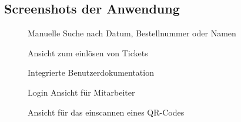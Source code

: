 \subsection{Screenshots der Anwendung}
\label{Screenshots}
\centering
{}
\clearpage
\begin{figure}[htb]
\centering
{}
\caption{Manuelle Suche nach Datum, Bestellnummer oder Namen}
\end{figure}
\clearpage
\begin{figure}[htb]
\centering
{}
\caption{Ansicht zum einlösen von Tickets}
\end{figure}
\clearpage
\begin{figure}[htb]
\centering
{}
\caption{Integrierte Benutzerdokumentation}
\end{figure}
\clearpage
\begin{figure}[htb]
\centering
{}
\caption{Login Ansicht für Mitarbeiter}
\end{figure}
\clearpage
\begin{figure}[htb]
\centering
{}
\caption{Ansicht für das einscannen eines QR-Codes}
\end{figure}
\clearpage